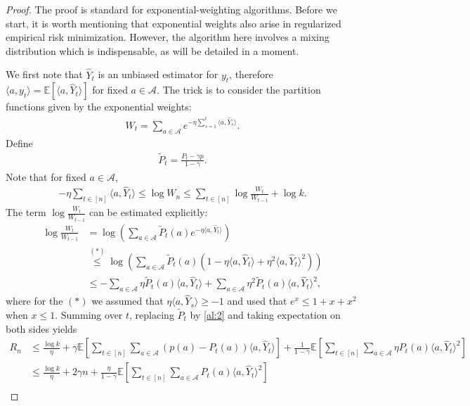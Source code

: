 \documentclass[10pt,a4article]{amsart}
\numberwithin{equation}{section}
\theoremstyle{plain}
\theoremstyle{definition}
\def\E{{\mathbb E}}
\begin{document}
\begin{proof}
The proof is standard for exponential-weighting algorithms. Before we start, it is worth mentioning that exponential weights also arise in regularized empirical risk minimization. However, the algorithm here involves a mixing distribution which is indispensable, as will be detailed in a moment. 

We first note that $\hat{Y}_t$ is an unbiased estimator for $y_t$, therefore $\langle a,y_t\rangle = \E[\langle a, \hat{Y}_t\rangle]$ for fixed $a\in\mathcal A$. The trick is to consider the partition functions given by the exponential weights:
\begin{align*}
W_t = \sum_{a\in\mathcal A}e^{-\eta\sum_{s=1}^t\langle a, \hat{Y}_s\rangle}.
\end{align*}
Define 
\begin{align}
\tilde{P}_t=\frac{P_t-\gamma p}{1-\gamma}.\label{al:2}
\end{align}
Note that for fixed $a\in\mathcal A$, 
\begin{align*}
-\eta\sum_{t\in [n]}\langle a, \hat{Y}_t\rangle\leq\log W_n\leq\sum_{t\in [n]}\log\frac{W_t}{W_{t-1}}+\log k.
\end{align*}
The term $\log\frac{W_t}{W_{t-1}}$ can be estimated explicitly:
\begin{align*}
\log\frac{W_t}{W_{t-1}}&=\log\left(\sum_{a\in\mathcal A}\tilde{P}_t(a)e^{-\eta\langle a, \hat{Y}_t\rangle}\right)\\
&\stackrel{(*)}{\leq}\log\left(\sum_{a\in\mathcal A}\tilde{P}_t(a)(1-\eta\langle a, \hat{Y}_t\rangle+\eta^2 \langle a, \hat{Y}_t\rangle^2)\right)\\
&\leq -\sum_{a\in\mathcal A}\eta\tilde{P}_t(a)\langle a, \hat{Y}_t\rangle+\sum_{a\in\mathcal A}\eta^2 \tilde{P}_t(a)\langle a, \hat{Y}_t\rangle^2,
\end{align*}
where for the $(*)$ we assumed that $\eta\langle a, \hat{Y}_s\rangle\geq -1$ and used that $e^x\leq 1+x+x^2$ when $x\leq 1$. Summing over $t$, replacing $\tilde{P}_t$ by \eqref{al:2} and taking expectation on both sides yields
\begin{align*}
R_n&\leq\frac{\log k}{\eta}+\gamma\E\left[\sum_{t\in [n]}\sum_{a\in\mathcal A}(p(a)-P_t(a))\langle a, \hat{Y}_t\rangle\right]+\frac{1}{1-\gamma}\E\left[\sum_{t\in [n]}\sum_{a\in\mathcal A}\eta P_t(a)\langle a, \hat{Y}_t\rangle^2\right]\\
&\leq \frac{\log k}{\eta}+2\gamma n+\frac{\eta}{1-\gamma}\E\left[\sum_{t\in [n]}\sum_{a\in\mathcal A} P_t(a)\langle a, \hat{Y}_t\rangle^2\right]\\

\end{align*}
\end{proof}
\end{document}
